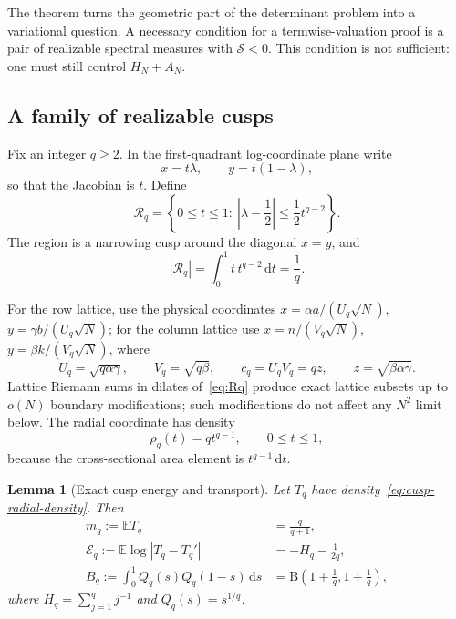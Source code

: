 \documentclass[11pt]{article}
\newcommand{\E}{\mathbb E}
\newcommand{\dd}{\,\mathrm d}
\newcommand{\1}{\mathbf 1}
\theoremstyle{plain}
\newtheorem{lemma}[theorem]{Lemma}
\theoremstyle{definition}
\theoremstyle{remark}
\begin{document}
The theorem turns the geometric part of the determinant problem into a
variational question.  A necessary condition for a termwise-valuation proof
is a pair of realizable spectral measures with $\mathscr S<0$.  This condition
is not sufficient: one must still control $H_N+A_N$.

\subsection{A family of realizable cusps}

Fix an integer $q\ge2$.  In the first-quadrant log-coordinate plane write
\[
 x=t\lambda,
 \qquad y=t(1-\lambda),
\]
so that the Jacobian is $t$.  Define
\begin{equation}\label{eq:Rq}
 \mathcal R_q=
 \left\{0\le t\le1:\
 \left|\lambda-\frac12\right|\le\frac12t^{q-2}\right\}.
\end{equation}
The region is a narrowing cusp around the diagonal $x=y$, and
\begin{equation}\label{eq:Rq-area}
 |\mathcal R_q|=\int_0^1t\,t^{q-2}\dd t=\frac1q.
\end{equation}

For the row lattice, use the physical coordinates
$x=\alpha a/(U_q\sqrt N)$, $y=\gamma b/(U_q\sqrt N)$; for the column lattice
use $x=n/(V_q\sqrt N)$, $y=\beta k/(V_q\sqrt N)$, where
\begin{equation}\label{eq:UqVq}
 U_q=\sqrt{q\alpha\gamma},
 \qquad
 V_q=\sqrt{q\beta},
 \qquad
 c_q=U_qV_q=qz,
 \qquad z=\sqrt{\beta\alpha\gamma}.
\end{equation}
Lattice Riemann sums in dilates of~\eqref{eq:Rq} produce exact lattice subsets up
to $o(N)$ boundary modifications; such modifications do not affect any
$N^2$ limit below.  The radial coordinate has density
\begin{equation}\label{eq:cusp-radial-density}
 \rho_q(t)=q t^{q-1},\qquad 0\le t\le1,
\end{equation}
because the cross-sectional area element is $t^{q-1}\dd t$.

\begin{lemma}[Exact cusp energy and transport]\label{lem:cusp-energy}
Let $T_q$ have density~\eqref{eq:cusp-radial-density}.  Then
\begin{align}
 m_q:=\E T_q&=\frac q{q+1},\label{eq:cusp-mean}\\
 \mathcal E_q:=\E\log|T_q-T_q'|
 &=-H_q-\frac1{2q},\label{eq:cusp-energy}\\
 B_q:=\int_0^1Q_q(s)Q_q(1-s)\dd s
 &=\mathrm B\!\left(1+\frac1q,1+\frac1q\right),\label{eq:cusp-B}
\end{align}
where $H_q=\sum_{j=1}^qj^{-1}$ and $Q_q(s)=s^{1/q}$.
\end{lemma}
\end{document}
